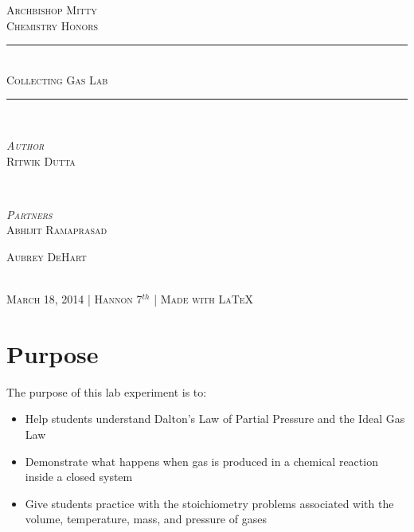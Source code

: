 \documentclass[11pt]{article}
\begin{document}
\begin{titlepage}

\newcommand{\HRule}{\rule{\linewidth}{0.5mm}} %
\newcommand{\tab}[1]{\hspace{.05\textwidth}\rlap{#1}}
\center %
 
\textsc{\Large Archbishop Mitty}\\[0.5cm] %
\textsc{\large Chemistry Honors}\\[0.5cm] %


\HRule \\[0.4cm]
\textsc{ \huge Collecting Gas Lab}\\ %
\HRule \\[1cm]
 

\begin{minipage}{0.4\textwidth}
\begin{flushleft} \large
{\textsc{\emph{Author}}}\\
\textsc{Ritwik Dutta}
\end{flushleft}
\end{minipage}
~
\begin{minipage}{0.4\textwidth}
\begin{flushright} \large
\small{\textsc{\emph{Partners}}}\\
\small{\textsc{Abhijit Ramaprasad}}

\small{\textsc{Aubrey DeHart}} %
\end{flushright}
\end{minipage}\\[4cm]

\vfill %
\large{\textsc{March 18, 2014 | Hannon 7$^{th}$ | Made with \LaTeX}\\[3cm]}

\end{titlepage}

\section{Purpose}
The purpose of this lab experiment is to:
\begin{itemize}
	\item Help students understand Dalton's Law of Partial Pressure and the Ideal Gas Law
	\item Demonstrate what happens when gas is produced in a chemical reaction inside a closed system
	\item Give students practice with the stoichiometry problems associated with the volume, temperature, mass, and pressure of gases 
\end{itemize}
\end{document}
